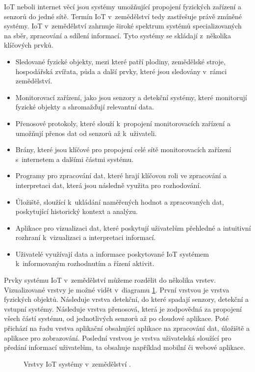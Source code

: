 IoT neboli internet věcí jsou systémy umožňující propojení fyzických zařízení a senzorů do jedné sítě. Termín IoT v~zemědělství tedy zastřešuje právě zmíněné systémy. IoT v~zemědělství zahrnuje široké spektrum systémů specializovaných na sběr, zpracování a sdílení informací. Tyto systémy se skládají z~několika klíčových prvků.
\begin{itemize}
    \item Sledované fyzické objekty, mezi které patří plodiny, zemědělské stroje, hospodářská zvířata, půda a další prvky, které jsou sledovány v~rámci zemědělství.
    \item Monitorovací zařízení, jako jsou senzory a detekční systémy, které monitorují fyzické objekty a shromažďují relevantní data.
    \item Přenosové protokoly, které slouží k~propojení monitorovacích zařízení a umožňují přenos dat od senzorů až k~uživateli.
    \item Brány, které jsou klíčové pro propojení celé sítě monitorovacích zařízení s~internetem a dalšími částmi systému.
    \item Programy pro zpracování dat, které hrají klíčovou roli ve zpracování a interpretaci dat, která jsou následně využita pro rozhodování.
    \item Úložiště, sloužící k~ukládání naměřených hodnot a zpracovaných dat, poskytující historický kontext a analýzu.
    \item Aplikace pro vizualizaci dat, které poskytují uživatelům přehledné a intuitivní rozhraní k~vizualizaci a interpretaci informací.
    \item Uživatelé využívají data a informace poskytované IoT systémem k~informovaným rozhodnutím a řízení aktivit. 
\end{itemize}
Prvky systému IoT v~zemědělství můžeme rozdělit do několika vrstev. Vizualizované vrstvy je možné vidět v~diagramu \ref{fig:iot_layers}. První vrstvou je vrstva fyzických objektů. Následuje vrstva detekční, do které spadají senzory, detekční a vstupní systémy. Následuje vrstva přenosová, která je zodpovědná za propojení všech částí systému, od jednotlivých senzorů až po cloudové aplikace. Poté přichází na řadu vrstva aplikační obsahující aplikace na zpracování dat, úložiště a aplikace pro zobrazování. Poslední vrstvou je vrstva uživatelská sloužící pro předání informací uživatelům, ta obsahuje například mobilní či webové aplikace. \cite{IOT_AGG}

\begin{figure}[ht]
  \centering
  
  \caption{Vrstvy IoT systémy v~zemědělství \cite{IOT_AGG}.}
  \label{fig:iot_layers}
\end{figure}

